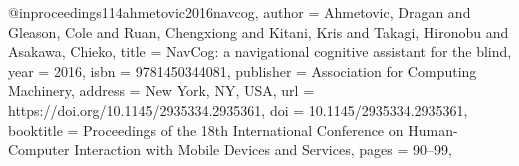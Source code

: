 @inproceedings{114ahmetovic2016navcog,
author = {Ahmetovic, Dragan and Gleason, Cole and Ruan, Chengxiong and Kitani, Kris and Takagi, Hironobu and Asakawa, Chieko},
title = {NavCog: a navigational cognitive assistant for the blind},
year = {2016},
isbn = {9781450344081},
publisher = {Association for Computing Machinery},
address = {New York, NY, USA},
url = {https://doi.org/10.1145/2935334.2935361},
doi = {10.1145/2935334.2935361},
booktitle = {Proceedings of the 18th International Conference on Human-Computer Interaction with Mobile Devices and Services},
pages = {90–99},
}